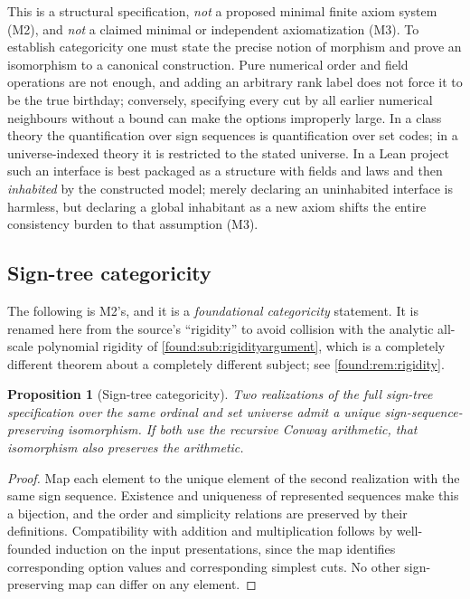 \documentclass[11pt,letterpaper]{article}
\numberwithin{equation}{section}
\newtheorem{proposition}[theorem]{Proposition}
\theoremstyle{definition}
\theoremstyle{remark}
\begin{document}
This is a structural specification, \emph{not} a proposed minimal finite axiom
system (M2), and \emph{not} a claimed minimal or independent axiomatization
(M3). To establish categoricity one must state the precise notion of morphism
and prove an isomorphism to a canonical construction. Pure numerical order and
field operations are not enough, and adding an arbitrary rank label does not
force it to be the true birthday; conversely, specifying every cut by all
earlier numerical neighbours without a bound can make the options improperly
large. In a class theory the quantification over sign sequences is quantification
over set codes; in a universe-indexed theory it is restricted to the stated
universe. In a Lean project such an interface is best packaged as a structure
with fields and laws and then \emph{inhabited} by the constructed model; merely
declaring an uninhabited interface is harmless, but declaring a global inhabitant
as a new axiom shifts the entire consistency burden to that assumption (M3).

\subsection{Sign-tree categoricity}
\label{found:sub:signtree}
The following is M2's, and it is a \emph{foundational categoricity} statement.
It is renamed here from the source's ``rigidity'' to avoid collision with the
analytic all-scale polynomial rigidity of \cref{found:sub:rigidityargument},
which is a completely different theorem about a completely different subject;
see \cref{found:rem:rigidity}.

\begin{proposition}[Sign-tree categoricity]\label{found:prop:signtree}
Two realizations of the full sign-tree specification over the same ordinal and
set universe admit a unique sign-sequence-preserving isomorphism. If both use
the recursive Conway arithmetic, that isomorphism also preserves the arithmetic.
\end{proposition}
\begin{proof}
Map each element to the unique element of the second realization with the same
sign sequence. Existence and uniqueness of represented sequences make this a
bijection, and the order and simplicity relations are preserved by their
definitions. Compatibility with addition and multiplication follows by
well-founded induction on the input presentations, since the map identifies
corresponding option values and corresponding simplest cuts. No other
sign-preserving map can differ on any element.
\end{proof}
\end{document}
